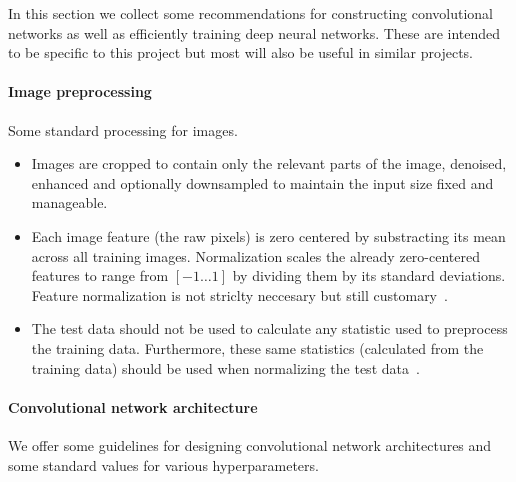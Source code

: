 In this section we collect some recommendations for constructing convolutional networks as well as efficiently training deep neural networks. These are intended to be specific to this project but most will also be useful in similar projects.

\paragraph{Image preprocessing} Some standard processing for images.
\begin{itemize}
	\item Images are cropped to contain only the relevant parts of the image, denoised, enhanced and optionally downsampled to maintain the input size fixed and manageable.

	\item Each image feature (the raw pixels) is zero centered by substracting its mean across all training images. Normalization scales the already zero-centered features to range from $[-1 \dots 1]$ by dividing them by its standard deviations. Feature normalization is not striclty neccesary but still customary~\cite{Karpathy2015}.

	\item The test data should not be used to calculate any statistic used to preprocess the training data. Furthermore, these same statistics (calculated from the training data) should be used when normalizing the test data~\cite{Karpathy2015}.
\end{itemize}

\paragraph{Convolutional network architecture}
We offer some guidelines for designing convolutional network architectures and some standard values for various hyperparameters.

